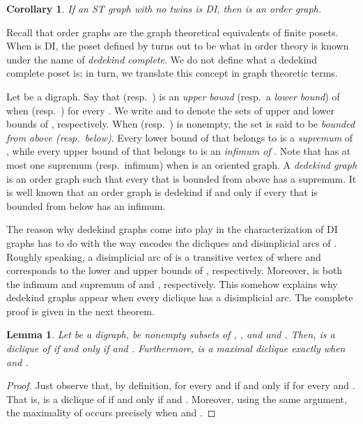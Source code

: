 \documentclass[a4paper,11pt]{article}
\newtheorem{lemma}[theorem]{Lemma}
\newtheorem{corollary}[theorem]{Corollary}
\begin{document}
\begin{corollary}
 If an ST graph with no twins is DI, then\/  is an order graph.
\end{corollary}

Recall that order graphs are the graph theoretical equivalents of finite posets.  When  is DI, the poset defined by  turns out to be what in order theory is known under the name of \emph{dedekind complete}.  We do not define what a dedekind complete poset is; in turn, we translate this concept in graph theoretic terms.

Let  be a digraph.  Say that  (resp.\ ) is an \emph{upper bound} (resp.\ a \emph{lower bound}) of  when  (resp.\ ) for every .  We write  and  to denote the sets of upper and lower bounds of , respectively.  When  (resp.\ ) is nonempty, the set  is said to be \emph{bounded from above (resp.\ below)}.  Every lower bound of  that belongs to  is a \emph{supremum} of , while every upper bound of  that belongs to  is an \emph{infimum of }.  Note that  has at most one supremum (resp.\ infimum) when  is an oriented graph.  A \emph{dedekind graph} is an order graph  such that every  that is bounded from above has a supremum.  It is well known that an order graph  is dedekind if and only if every  that is bounded from below has an infimum.

The reason why dedekind graphs come into play in the characterization of DI graphs has to do with the way  encodes the dicliques and disimplicial arcs of .  Roughly speaking, a disimplicial arc  of  is a transitive vertex  of  where  and  corresponds to the lower and upper bounds  of , respectively.  Moreover,  is both the infimum and supremum of  and , respectively.  This somehow explains why dedekind graphs appear when every diclique has a disimplicial arc.  The complete proof is given in the next theorem.  

\begin{lemma}\label{lem:dicliques in JOIN}
  Let  be a digraph,  be nonempty subsets of , , and  and .  Then,   is a diclique of  if and only if  and .  Furthermore,  is a maximal diclique exactly when  and .
\end{lemma}

\begin{proof}
  Just observe that, by definition,  for every  and  if and only if  for every  and .  That is,  is a diclique of  if and only if  and .  Moreover, using the same argument, the maximality of  occurs precisely when  and .
\end{proof}
\end{document}
